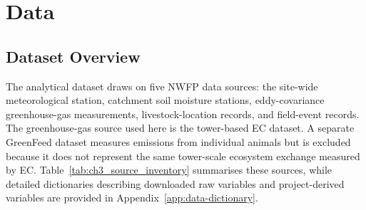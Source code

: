 \chapter{Data} \label{Chap3}

\section{Dataset Overview}

The analytical dataset draws on five NWFP data sources: the site-wide meteorological station,
catchment soil moisture stations, eddy-covariance greenhouse-gas measurements, livestock-location
records, and field-event records. The greenhouse-gas source used here is the tower-based EC dataset.
A separate GreenFeed dataset measures emissions from individual animals but is excluded because it does
not represent the same tower-scale ecosystem exchange measured by EC. Table~\ref{tab:ch3_source_inventory}
summarises these sources, while detailed dictionaries describing downloaded raw variables and
project-derived variables are provided in Appendix~\ref{app:data-dictionary}.

